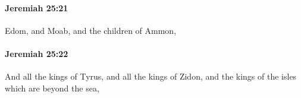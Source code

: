		\paragraph{Jeremiah 25:21} %
			\label{JEREMIAH-25-21}

			Edom, and Moab, and the children of Ammon,


		\paragraph{Jeremiah 25:22} %
			\label{JEREMIAH-25-22}

			And all the kings of Tyrus, and all the kings of Zidon, and the kings of the isles which are beyond the sea,


